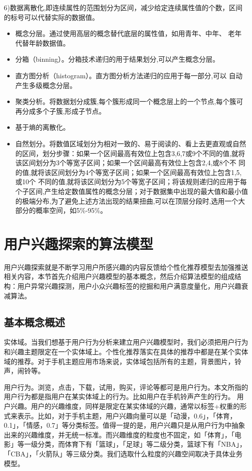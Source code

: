  6)数据离散化,即连续属性的范围划分为区间，减少给定连续属性值的个数，区间的标号可以代替实际的数据值。
  \begin{itemize}
  \item 概念分层。通过使用高层的概念替代底层的属性值，如用青年、中年、 老年代替年龄数据值。
  \item 分箱（binning）。分箱技术递归的用于结果划分,可以产生概念分层。
  \item 直方图分析（histogram）。直方图分析方法递归的应用于每一部分,可以 自动产生多级概念分层。
  \item 聚类分析。将数据划分成簇,每个簇形成同一个概念层上的一个节点,每个簇可再分成多个子簇,形成子节点。
  \item 基于熵的离散化。
  \item 自然划分。将数值区域划分为相对一致的、易于阅读的、看上去更直观或自然的区间，划分步骤：如果一个区间最高有效位上包含3,6,7或9个不同的值,就将该区间划分为3个等宽子区间；如果一个区间最高有效位上包含2,4,或8个不 同的值,就将该区间划分为4个等宽子区间；如果一个区间最高有效位上包含1,5,或10个 不同的值,就将该区间划分为5个等宽子区间；将该规则递归的应用于每个子区间,产生给定数值属性的概念分层；对于数据集中出现的最大值和最小值的极端分布,为了避免上述方法出现的结果扭曲,可以在顶层分段时,选用一个大部分的概率空间，如5\%-95\%。
  \end{itemize}

\section{用户兴趣探索的算法模型}
用户兴趣探索就是不断学习用户所感兴趣的内容反馈给个性化推荐模型去加强推送相关内容，本节首先介绍用户兴趣模型的基本概念，然后介绍算法模型的组成结构：用户异常兴趣探测，用户小众兴趣标签的挖掘和用户满意度量化，用户兴趣衰减算法。

  \subsection{基本概念概述}
  实体域。当我们想基于用户行为分析来建立用户兴趣模型时，我们必须把用户行为和兴趣主题限定在一个实体域上。个性化推荐落实在具体的推荐中都是在某个实体域的推荐。对于手机主题应用市场来说，实体域包括所有的主题，背景图片，铃声，闹铃等。

  用户行为。浏览，点击，下载，试用，购买，评论等都可是用户行为。本文所指的用户行为都是指用户在某实体域上的行为。比如用户在手机铃声产生的行为。
  用户兴趣。用户的兴趣维度，同样是限定在某实体域的兴趣，通常以标签+权重的形式来表示。比如，对于手机主题，用户兴趣向量可以是「动漫，0.6」，「体育，0.1」，「情感，0.7」等分类标签。值得一提的是，用户兴趣只是从用户行为中抽象出来的兴趣维度，并无统一标准。而兴趣维度的粒度也不固定，如「体育」，「电影」等一级分类，而体育下有「篮球」，「足球」等二级分类，篮球下有「NBA」，「CBA」，「火箭队」等三级分类。我们选取什么粒度的兴趣空间取决于具体业务模型。

